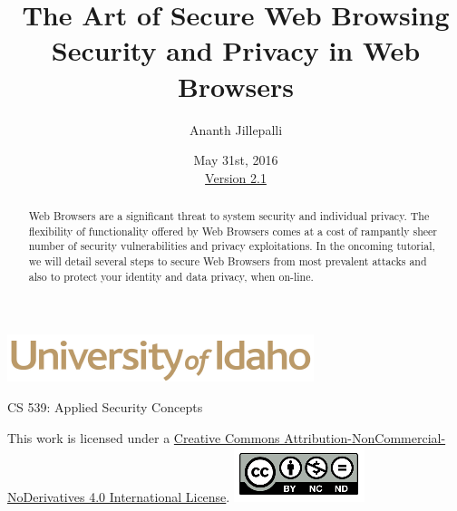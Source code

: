 \documentclass[12pt]{extarticle}
\begin{document}
	\title{ The Art of Secure Web Browsing \\ \large Security and Privacy in Web Browsers}
	\author{Ananth Jillepalli}
	\date{May 31st, 2016 \\ \hyperref[changelog]{Version 2.1}} %
	\renewcommand{\abstractname}{Summary}
	\begin{titlepage}
		\maketitle
		\begin{center}
			\includegraphics[scale=.5]{UofI}
			
			\large{CS 539: Applied Security Concepts}
			
			\vskip 40pt
			
		\end{center}
		\begin{abstract}
			Web Browsers are a significant threat to system security and individual privacy. The flexibility of functionality offered by Web Browsers comes at a cost of rampantly sheer number of security vulnerabilities and privacy exploitations. In the oncoming tutorial, we will detail several steps to secure Web Browsers from most prevalent attacks and also to protect your identity and data privacy, when on-line.
		\end{abstract}
		
		
		\vfill
		\begin{center}
		This work is licensed under a \href{http://creativecommons.org/licenses/by/4.0/}{Creative Commons Attribution-NonCommercial-NoDerivatives 4.0 International License}.
		\vskip 10pt
		\includegraphics[scale=.5]{cc}
		\end{center}
		
	\end{titlepage}
	
	
	\pagebreak
	\tableofcontents
	
	
\end{document}
